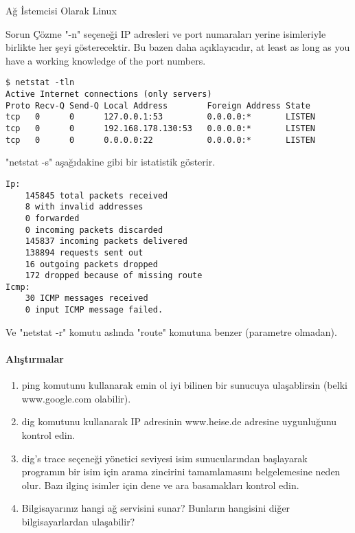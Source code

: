 \begin{section}{Ağ İstemcisi Olarak Linux}
\begin{subsection}{Sorun Çözme}
"-n" seçeneği IP adresleri ve port numaraları yerine isimleriyle birlikte her şeyi gösterecektir. Bu bazen daha açıklayıcıdır, at least as long as you have a working knowledge of the port numbers.

\begin{verbatim}
$ netstat -tln
Active Internet connections (only servers)
Proto Recv-Q Send-Q Local Address        Foreign Address State
tcp   0      0      127.0.0.1:53         0.0.0.0:*       LISTEN
tcp   0      0      192.168.178.130:53   0.0.0.0:*       LISTEN
tcp   0      0      0.0.0.0:22           0.0.0.0:*       LISTEN
\end{verbatim}

"netstat -s" aşağıdakine gibi bir istatistik gösterir.

\begin{verbatim}
Ip:
    145845 total packets received
    8 with invalid addresses
    0 forwarded
    0 incoming packets discarded
    145837 incoming packets delivered
    138894 requests sent out
    16 outgoing packets dropped
    172 dropped because of missing route
Icmp:
    30 ICMP messages received
    0 input ICMP message failed.
\end{verbatim}

Ve "netstat -r" komutu aslında "route" komutuna benzer (parametre olmadan).

\paragraph{{\Huge{\PencilLeftDown}}Alıştırmalar}{
\begin{enumerate}
 \item ping komutunu kullanarak emin ol iyi bilinen bir sunucuya ulaşablirsin (belki www.google.com olabilir).
 \item dig komutunu kullanarak IP adresinin www.heise.de adresine uygunluğunu kontrol edin.
 \item dig's trace seçeneği yönetici seviyesi isim sunucularından başlayarak programın bir isim için arama zincirini tamamlamasını belgelemesine neden olur. Bazı ilginç isimler için dene ve ara basamakları kontrol edin.
 \item Bilgisayarınız hangi ağ servisini sunar? Bunların hangisini diğer bilgisayarlardan ulaşabilir?
\end{enumerate}}


\end{subsection}
\end{section}
